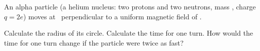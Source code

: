 An alpha particle (a helium nucleus: two protons and two neutrons, mass \maO, charge $q = 2e$) moves at \veO\ perpendicular to a uniform magnetic field of \BO.

\begin{abcliste}
\abc Calculate the radius of its circle.
\abc Calculate the time for one turn.
\abc How would the time for one turn change if the particle were twice as fast?
\end{abcliste}
